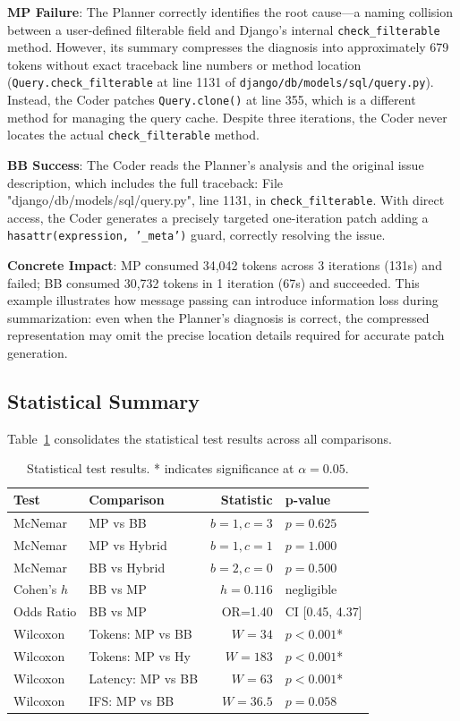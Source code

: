 \documentclass{ieeeaccess}
\begin{document}
\textbf{MP Failure}: The Planner correctly identifies the root cause---a naming collision between a user-defined filterable field and Django's internal \texttt{check\_filterable} method. However, its summary compresses the diagnosis into approximately 679 tokens without exact traceback line numbers or method location (\texttt{Query.check\_filterable} at line 1131 of \texttt{django/db/models/sql/query.py}). Instead, the Coder patches \texttt{Query.clone()} at line 355, which is a different method for managing the query cache. Despite three iterations, the Coder never locates the actual \texttt{check\_filterable} method.

\textbf{BB Success}: The Coder reads the Planner's analysis and the original issue description, which includes the full traceback: File "django/db/models/sql/query.py", line 1131, in \texttt{check\_filterable}. With direct access, the Coder generates a precisely targeted one-iteration patch adding a \texttt{hasattr(expression, '\_meta')} guard, correctly resolving the issue.

\textbf{Concrete Impact}: MP consumed 34,042 tokens across 3 iterations (131s) and failed; BB consumed 30,732 tokens in 1 iteration (67s) and succeeded. This example illustrates how message passing can introduce information loss during summarization: even when the Planner's diagnosis is correct, the compressed representation may omit the precise location details required for accurate patch generation.

\subsection{Statistical Summary}
\label{sec:stat-summary}

Table~\ref{tab:statistics} consolidates the statistical test results across all comparisons.

\begin{table}[!ht]
\centering
\footnotesize
\caption{Statistical test results. * indicates significance at $\alpha=0.05$.}
\label{tab:statistics}
\begin{tabular}{@{}llrl@{}}
\toprule
\textbf{Test} & \textbf{Comparison} & \textbf{Statistic} & \textbf{p-value} \\
\midrule
McNemar & MP vs BB & $b=1, c=3$ & $p=0.625$ \\
McNemar & MP vs Hybrid & $b=1, c=1$ & $p=1.000$ \\
McNemar & BB vs Hybrid & $b=2, c=0$ & $p=0.500$ \\
Cohen's $h$ & BB vs MP & $h=0.116$ & negligible \\
Odds Ratio & BB vs MP & OR=1.40 & CI [0.45, 4.37] \\
Wilcoxon & Tokens: MP vs BB & $W=34$ & $p<0.001$* \\
Wilcoxon & Tokens: MP vs Hy & $W=183$ & $p<0.001$* \\
Wilcoxon & Latency: MP vs BB & $W=63$ & $p<0.001$* \\
Wilcoxon & IFS: MP vs BB & $W=36.5$ & $p=0.058$ \\
\bottomrule
\end{tabular}
\end{table}
\end{document}
